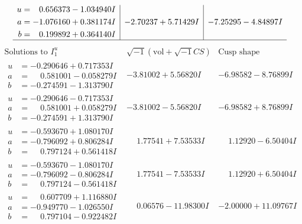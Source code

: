 \documentclass[1p]{elsarticle_modified}
\theoremstyle{definition}
\newcommand{\I}{\sqrt{-1}}
\begin{document}
$$\begin{array}{c|c|c}
\begin{aligned}
u &= \phantom{-}0.656373 - 1.034940 I \\
a &= -1.076160 + 0.381174 I \\
b &= \phantom{-}0.199892 + 0.364140 I\end{aligned}
 & -2.70237 + 5.71429 I & -7.25295 - 4.84897 I\\
 \hline 
 \end{array}$$\newpage$$\begin{array}{c|c|c}  
\text{Solutions to }I^u_{1}& \I (\text{vol} + \sqrt{-1}CS) & \text{Cusp shape}\\
 \hline 
\begin{aligned}
u &= -0.290646 + 0.717353 I \\
a &= \phantom{-}0.581001 - 0.058279 I \\
b &= -0.274591 - 1.313790 I\end{aligned}
 & -3.81002 + 5.56820 I & -6.98582 - 8.76899 I \\ \hline\begin{aligned}
u &= -0.290646 - 0.717353 I \\
a &= \phantom{-}0.581001 + 0.058279 I \\
b &= -0.274591 + 1.313790 I\end{aligned}
 & -3.81002 - 5.56820 I & -6.98582 + 8.76899 I \\ \hline\begin{aligned}
u &= -0.593670 + 1.080170 I \\
a &= -0.796092 + 0.806284 I \\
b &= \phantom{-}0.797124 + 0.561418 I\end{aligned}
 & \phantom{-}1.77541 + 7.53533 I & \phantom{-}1.12920 - 6.50404 I \\ \hline\begin{aligned}
u &= -0.593670 - 1.080170 I \\
a &= -0.796092 - 0.806284 I \\
b &= \phantom{-}0.797124 - 0.561418 I\end{aligned}
 & \phantom{-}1.77541 - 7.53533 I & \phantom{-}1.12920 + 6.50404 I \\ \hline\begin{aligned}
u &= \phantom{-}0.607709 + 1.116880 I \\
a &= -0.949770 - 1.026550 I \\
b &= \phantom{-}0.797104 - 0.922482 I\end{aligned}
 & \phantom{-}0.06576 - 11.98300 I & -2.00000 + 11.09767 I \\ \hline\begin{aligned}

\end{aligned}
\end{array}$$
\end{document}
